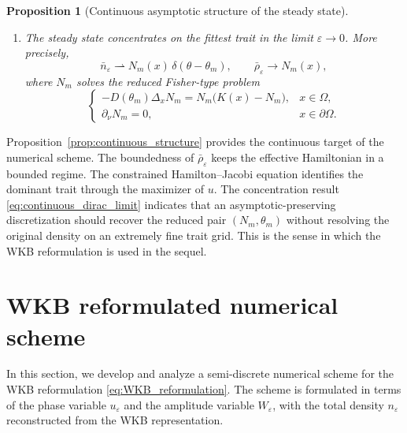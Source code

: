 \documentclass[11pt, dina4, amsfont12]{article}
\newtheorem{proposition}{Proposition}[section]
\newtheorem{remark}{Remark}[section]
\begin{document}
\begin{proposition}[Continuous asymptotic structure of the steady state]
\begin{enumerate}
\item The steady state concentrates on the fittest trait in the limit \(\varepsilon\to0\). More precisely,
\begin{equation}\label{eq:continuous_dirac_limit}
\bar n_\varepsilon \rightharpoonup N_m(x)\,\delta(\theta-\theta_m),
\qquad
\bar\rho_\varepsilon \to N_m(x),
\end{equation}
where \(N_m\) solves the reduced Fisher-type problem
\begin{equation}\label{eq:Nm_problem}
\begin{cases}
-D(\theta_m)\Delta_x N_m = N_m\bigl(K(x)-N_m\bigr), & x\in\Omega,\\
\partial_\nu N_m = 0, & x\in\partial\Omega.
\end{cases}
\end{equation}
\end{enumerate}
\end{proposition}

Proposition~\ref{prop:continuous_structure} provides the continuous target of the numerical scheme. The boundedness of \(\bar\rho_\varepsilon\) keeps the effective Hamiltonian in a bounded regime. The constrained Hamilton--Jacobi equation identifies the dominant trait through the maximizer of \(u\). The concentration result \eqref{eq:continuous_dirac_limit} indicates that an asymptotic-preserving discretization should recover the reduced pair \((N_m,\theta_m)\) without resolving the original density on an extremely fine trait grid. This is the sense in which the WKB reformulation is used in the sequel.



\section{WKB reformulated numerical scheme}

In this section, we develop and analyze a semi-discrete numerical scheme for
the WKB reformulation \eqref{eq:WKB_reformulation}. The scheme is formulated
in terms of the phase variable \(u_\varepsilon\) and the amplitude variable
\(W_\varepsilon\), with the total density \(n_\varepsilon\) reconstructed from
the WKB representation.
\end{document}
